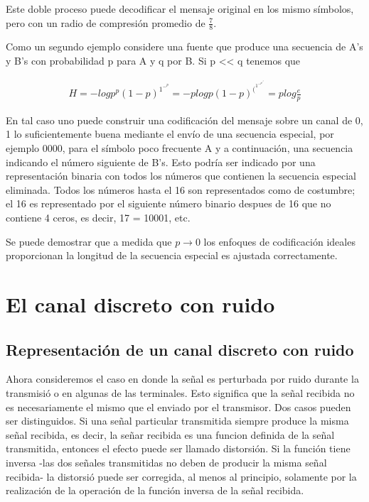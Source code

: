 Este doble proceso puede decodificar el mensaje original en los mismo s\'{i}mbolos, pero con un radio de compresi\'{o}n promedio de $\frac{7}{8}$.

Como un segundo ejemplo considere una fuente que produce una secuencia de A's y B's con probabilidad p para A y q por B. Si p << q tenemos que

\begin{equation}
\begin{array}{rcl}
H = - log p^p (1 - p)^1^-^p
= -p log p(1-p)^(^1^-^p^)^/^p
= p log \frac{e}{p}
\end{array}
\end{equation}

En tal caso uno puede construir una codificaci\'{o}n del mensaje sobre un canal de 0, 1 lo suficientemente buena mediante el env\'{i}o de una secuencia especial, por ejemplo 0000, para el s\'{i}mbolo poco frecuente A y a continuaci\'{o}n, una secuencia indicando el n\'{u}mero siguiente de B's. Esto podr\'{i}a ser indicado por una representaci\'{o}n binaria con todos los n\'{u}meros que contienen la secuencia especial eliminada. Todos los n\'{u}meros hasta el 16 son representados como de costumbre; el 16 es representado por el siguiente n\'{u}mero binario despues de 16 que no contiene 4 ceros, es decir, 17  = 10001, etc.

Se puede demostrar que a medida que $p\rightarrow{0}$ los enfoques de codificaci\'{o}n ideales proporcionan la longitud de la secuencia especial es ajustada correctamente.

\part{El canal discreto con ruido}
\label{part:2}

\chapter{Representaci\'{o}n de un canal discreto con ruido}
\label{sec:11}

Ahora consideremos el caso en donde la se\~{n}al es perturbada por ruido durante la transmisi\'{o} o en algunas de las terminales. Esto significa que la se\~{n}al recibida no es necesariamente el mismo que el enviado por el transmisor. Dos casos pueden ser distinguidos. Si una se\~{n}al particular transmitida siempre produce la misma se\~{n}al recibida, es decir, la se\~{n}ar recibida es una funcion definida de la se\~{n}al transmitida, entonces el efecto puede ser llamado distorsi\'{o}n. Si la funci\'{o}n tiene inversa -las dos se\~{n}ales transmitidas no deben de producir la misma se\~{n}al recibida- la distorsi\'{o} puede ser corregida, al menos al principio, solamente por la realizaci\'{o}n de la operaci\'{o}n de la funci\'{o}n inversa de la se\~{n}al recibida.

